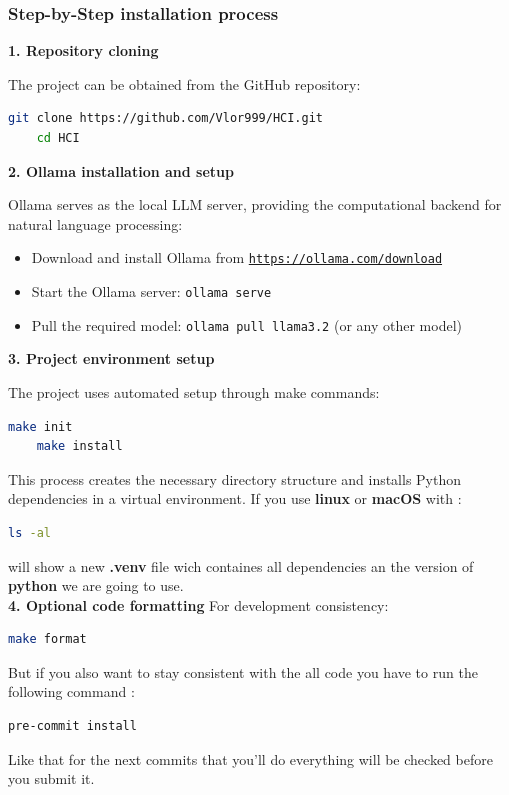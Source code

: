 \subsubsection{Step-by-Step installation process}

\textbf{1. Repository cloning}

The project can be obtained from the GitHub repository:

\begin{lstlisting}[language=bash]
    git clone https://github.com/Vlor999/HCI.git
    cd HCI
\end{lstlisting}
\textbf{2. Ollama installation and setup}

Ollama serves as the local LLM server, providing the computational backend for natural language processing:

\begin{itemize}
    \item Download and install Ollama from \href{https://ollama.com/download}{\texttt{https://ollama.com/download}}
    \item Start the Ollama server: \texttt{ollama serve}
    \item Pull the required model: \texttt{ollama pull llama3.2} (or any other model)
\end{itemize}
\textbf{3. Project environment setup}

The project uses automated setup through make commands:

\begin{lstlisting}[language=bash]
    make init
    make install
\end{lstlisting}

This process creates the necessary directory structure and installs Python dependencies in a virtual environment.
If you use \textbf{linux} or \textbf{macOS} with :

\begin{lstlisting}[language=bash]
    ls -al
\end{lstlisting}
will show a new \textbf{.venv} file wich containes all dependencies an the version of \textbf{python} we are going to use.\\
\textbf{4. Optional code formatting}
For development consistency:

\begin{lstlisting}[language=bash]
    make format
\end{lstlisting}
But if you also want to stay consistent with the all code you have to run the following command :
\begin{lstlisting}[language=bash]
    pre-commit install
\end{lstlisting}
Like that for the next commits that you'll do everything will be checked before you submit it.

